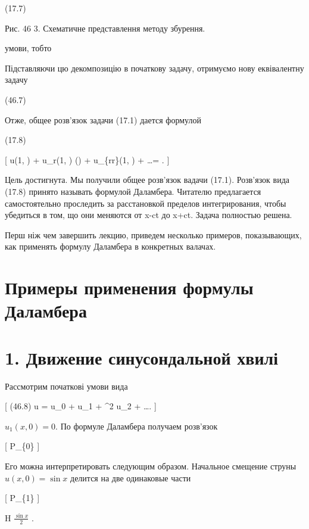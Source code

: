 \documentclass[
  ukrainian,
]{article}
\begin{document}
(17.7)

Рис. 46 3. Схематичне представлення методу збурення.

умови, тобто

Підставляючи цю декомпозицію в початкову задачу, отримуємо нову
еквівалентну задачу

(46.7)

Отже, общее розв'язок задачи (17.1) дается формулой

(17.8)

{[} u(1, \theta) + u\_r(1, \theta) (\varepsilon \sin \theta) +
u\_\{rr\}(1, \theta)  + \dots =
\cos \theta. {]}

Цель достигнута. Мы получили общее розв'язок вадачи (17.1). Розв'язок
вида (17.8) принято называть формулой Даламбера. Читателю предлагается
самостоятельно проследить за расстановкой пределов интегрирования, чтобы
убедиться в том, що они меняются от x-ct до x+ct. Задача полностью
решена.

Перш ніж чем завершить лекцию, приведем несколько примеров,
показывающих, как применять формулу Даламбера в конкретных валачах.

\section{Примеры применения формулы
Даламбера}\label{ux43fux440ux438ux43cux435ux440ux44b-ux43fux440ux438ux43cux435ux43dux435ux43dux438ux44f-ux444ux43eux440ux43cux443ux43bux44b-ux434ux430ux43bux430ux43cux431ux435ux440ux430}

\section{1. Движение синусондальной
хвилі}\label{ux434ux432ux438ux436ux435ux43dux438ux435-ux441ux438ux43dux443ux441ux43eux43dux434ux430ux43bux44cux43dux43eux439-ux445ux432ux438ux43bux456}

Рассмотрим початкові умови вида

{[} (46.8) u = u\_0 + \varepsilon u\_1 + \varepsilon\^{}2 u\_2 + \dots.
{]}

\(u_1(x, 0) = 0.\) По формуле Даламбера получаем розв'язок

{[} P\_\{0\} {]}

Его можна интерпретировать следующим образом. Начальное смещение струны
\(u(x, 0) = \sin x\) делится на две одинаковые части

{[} P\_\{1\} {]}

H \(\frac{\sin x}{2}\) .
\end{document}
